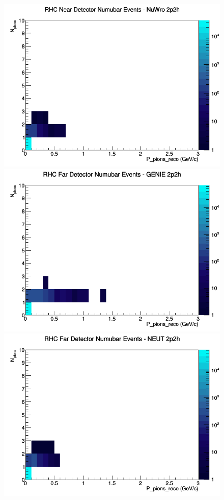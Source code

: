 \documentclass[12pt]{article}
\begin{document}
\begin{figure}[h]
\includegraphics[width=\linewidth]{eff_N_P/GAr/pions/2p2h_RHC_ND_numubar_N_P_NuWro.png}
\endminipage
\newline
{}
\includegraphics[width=\linewidth]{eff_N_P/GAr/pions/2p2h_RHC_FD_numubar_N_P_GENIE.png}
\endminipage
{}
\includegraphics[width=\linewidth]{eff_N_P/GAr/pions/2p2h_RHC_FD_numubar_N_P_NEUT.png}

\end{figure}
\end{document}

